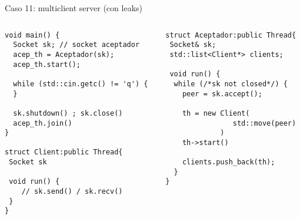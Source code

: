 \begin{frame}[fragile]{Caso 11: multiclient server (con leaks)}{}
    \begin{columns}[T]
      \begin{column}{.50\linewidth}
\begin{lstlisting}[style=normalnonumbers]
void main() {
  Socket sk; // socket aceptador
  acep_th = Aceptador(sk);
  acep_th.start();

  while (std::cin.getc() != 'q') {
  }

  sk.shutdown() ; sk.close()
  acep_th.join()
}

struct Client:public Thread{
 Socket sk

 void run() {
    // sk.send() / sk.recv()
 }
}
\end{lstlisting}
      \end{column}
      \begin{column}{.50\linewidth}
\begin{lstlisting}[style=normalnonumbers]
struct Aceptador:public Thread{
 Socket& sk;
 std::list<Client*> clients;

 void run() {
  while (/*sk not closed*/) {
    peer = sk.accept();

    th = new Client(
                std::move(peer)
             )
    th->start()

    clients.push_back(th);
  }
}
\end{lstlisting}
      \end{column}
      \end{columns}
\end{frame}
